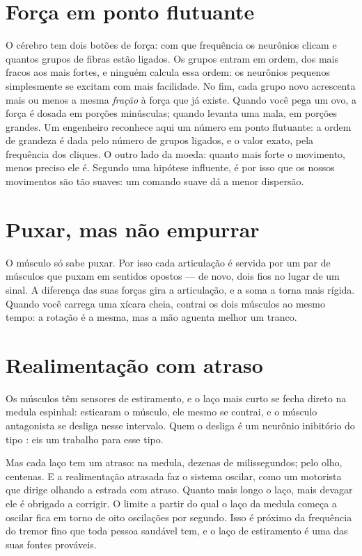 \section*{Força em ponto flutuante}

O cérebro tem dois botões de força: com que frequência os neurônios clicam e quantos grupos de fibras estão ligados. Os grupos entram em ordem, dos mais fracos aos mais fortes, e ninguém calcula essa ordem: os neurônios pequenos simplesmente se excitam com mais facilidade. No fim, cada grupo novo acrescenta mais ou menos a mesma \emph{fração} à força que já existe. Quando você pega um ovo, a força é dosada em porções minúsculas; quando levanta uma mala, em porções grandes. Um engenheiro reconhece aqui um número em ponto flutuante: a ordem de grandeza é dada pelo número de grupos ligados, e o valor exato, pela frequência dos cliques. O outro lado da moeda: quanto mais forte o movimento, menos preciso ele é. Segundo uma hipótese influente, é por isso que os nossos movimentos são tão suaves: um comando suave dá a menor dispersão.

\section*{Puxar, mas não empurrar}

O músculo só sabe puxar. Por isso cada articulação é servida por um par de músculos que puxam em sentidos opostos --- de novo, dois fios no lugar de um sinal. A diferença das suas forças gira a articulação, e a soma a torna mais rígida. Quando você carrega uma xícara cheia, contrai os dois músculos ao mesmo tempo: a rotação é a mesma, mas a mão aguenta melhor um tranco.


\section*{Realimentação com atraso}

Os músculos têm sensores de estiramento, e o laço mais curto se fecha direto na medula espinhal: esticaram o músculo, ele mesmo se contrai, e o músculo antagonista se desliga nesse intervalo. Quem o desliga é um neurônio inibitório do tipo : eis um trabalho para esse tipo.

Mas cada laço tem um atraso: na medula, dezenas de milissegundos; pelo olho, centenas. E a realimentação atrasada faz o sistema oscilar, como um motorista que dirige olhando a estrada com atraso. Quanto mais longo o laço, mais devagar ele é obrigado a corrigir. O limite a partir do qual o laço da medula começa a oscilar fica em torno de oito oscilações por segundo. Isso é próximo da frequência do tremor fino que toda pessoa saudável tem, e o laço de estiramento é uma das suas fontes prováveis.

